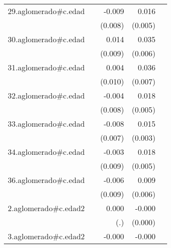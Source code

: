 {\begin{longtable}{l*{4}{D{.}{.}{-1}}}
\addlinespace
29.aglomerado#c.edad&                     &      -0.009         &       0.016\sym{**} &                     \\
            &                     &     (0.008)         &     (0.005)         &                     \\
\addlinespace
30.aglomerado#c.edad&                     &       0.014         &       0.035\sym{***}&                     \\
            &                     &     (0.009)         &     (0.006)         &                     \\
\addlinespace
31.aglomerado#c.edad&                     &       0.004         &       0.036\sym{***}&                     \\
            &                     &     (0.010)         &     (0.007)         &                     \\
\addlinespace
32.aglomerado#c.edad&                     &      -0.004         &       0.018\sym{***}&                     \\
            &                     &     (0.008)         &     (0.005)         &                     \\
\addlinespace
33.aglomerado#c.edad&                     &      -0.008         &       0.015\sym{***}&                     \\
            &                     &     (0.007)         &     (0.003)         &                     \\
\addlinespace
34.aglomerado#c.edad&                     &      -0.003         &       0.018\sym{***}&                     \\
            &                     &     (0.009)         &     (0.005)         &                     \\
\addlinespace
36.aglomerado#c.edad&                     &      -0.006         &       0.009         &                     \\
            &                     &     (0.009)         &     (0.006)         &                     \\
\addlinespace
2.aglomerado#c.edad2&                     &       0.000         &      -0.000\sym{**} &                     \\
            &                     &         (.)         &     (0.000)         &                     \\
\addlinespace
3.aglomerado#c.edad2&                     &      -0.000         &      -0.000\sym{***}&                     \\

\end{longtable}}
